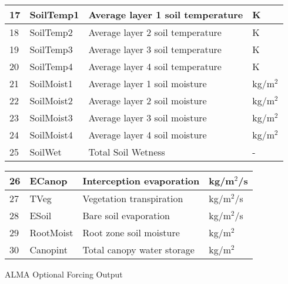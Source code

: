 \begin{tabular}{|l|l|l|l|}
17 & SoilTemp1    & Average layer 1 soil temperature & K             \\ \hline
18 & SoilTemp2    & Average layer 2 soil temperature & K             \\ \hline
19 & SoilTemp3    & Average layer 3 soil temperature & K             \\ \hline
20 & SoilTemp4    & Average layer 4 soil temperature & K             \\ \hline
21 & SoilMoist1   & Average layer 1 soil moisture   & kg/m$^2$      \\ \hline
22 & SoilMoist2   & Average layer 2 soil moisture   & kg/m$^2$      \\ \hline
23 & SoilMoist3   & Average layer 3 soil moisture   & kg/m$^2$      \\ \hline
24 & SoilMoist4   & Average layer 4 soil moisture   & kg/m$^2$      \\ \hline
25 & SoilWet      & Total Soil Wetness              & -             \\ \hline
\end{tabular}

\begin{tabular}{|l|l|l|l|} \hline
26 & ECanop       & Interception evaporation        & kg/m$^2$/s    \\ \hline
27 & TVeg         & Vegetation transpiration        & kg/m$^2$/s    \\ \hline
28 & ESoil        & Bare soil evaporation           & kg/m$^2$/s    \\ \hline
29 & RootMoist    & Root zone soil moisture         & kg/m$^2$      \\ \hline
30 & Canopint     & Total canopy water storage      & kg/m$^2$      \\ \hline
\end{tabular}

\nextpar

\nextpar

ALMA Optional Forcing Output

